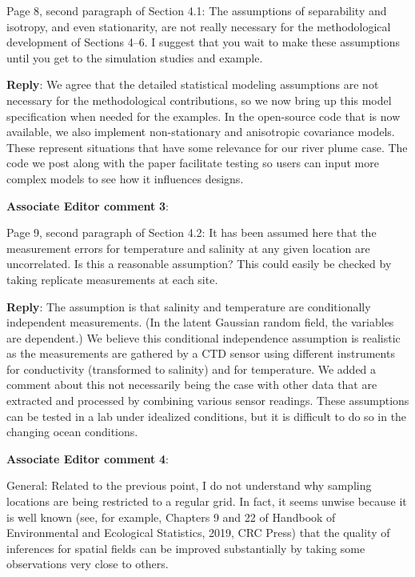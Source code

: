 \documentclass[a4paper]{article}
\def\aecom{\textbf{Associate Editor comment }}
\def\reply{\textbf{Reply}}
\begin{document}
Page 8, second paragraph of Section 4.1: The assumptions of separability and isotropy, and even stationarity, are not really necessary for the methodological development of Sections 4–6. I suggest that you wait to make these assumptions until you get to the simulation studies and example.\par

\reply: We agree that the detailed statistical modeling assumptions are not necessary for the methodological contributions, so we now bring up this model specification when needed for the examples. 
In the open-source code that is now available, we also implement non-stationary and anisotropic covariance models. These represent situations that have some relevance for our river plume case. The code we post along with the paper facilitate testing so users can input more complex models to see how it influences designs. 

\vspace{1em}

\vspace{5mm}
\noindent \aecom \textbf{3}:

Page 9, second paragraph of Section 4.2: It has been assumed here that the measurement errors for temperature and salinity at any given location are uncorrelated. Is this a reasonable assumption? This could easily be checked by taking replicate measurements at each site.\par

\reply: The assumption is that salinity and temperature are conditionally independent measurements. (In the latent Gaussian random field, the variables are dependent.) We believe this conditional independence assumption is realistic as the measurements are gathered by a CTD sensor using different instruments for conductivity (transformed to salinity) and for temperature. 
We added a comment about this not necessarily being the case with other data that are extracted and processed by combining various sensor readings. 
These assumptions can be tested in a lab under idealized conditions, but it is difficult to do so in the changing ocean conditions. 

\vspace{1em}

\vspace{5mm}
\noindent \aecom \textbf{4}:

General: Related to the previous point, I do not understand why sampling locations are being restricted to a regular grid. In fact, it seems unwise because it is well known (see, for example, Chapters 9 and 22 of Handbook of Environmental and Ecological Statistics, 2019, CRC Press) that the quality of inferences for spatial fields can be improved substantially by taking some
observations very close to others.\par
\end{document}

